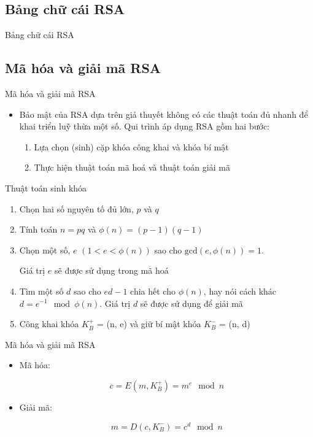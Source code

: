 \documentclass{beamer}
\begin{document}
\subsection{Bảng chữ cái RSA}
\begin{frame}{Bảng chữ cái RSA}

\end{frame}
\subsection{Mã hóa và giải mã RSA}
\begin{frame}{Mã hóa và giải mã RSA}
\begin{itemize}
\item Bảo mật của RSA dựa trên giả thuyết không có các thuật toán đủ nhanh để khai triển luỹ thừa một số. Qui trình áp dụng RSA gồm hai bước:
\begin{enumerate}
\item Lựa chọn (sinh) cặp khóa công khai và khóa bí mật
\item Thực hiện thuật toán mã hoá và thuật toán giải mã
\end{enumerate}
\end{itemize}
\end{frame}
\begin{frame}{Thuật toán sinh khóa}

\begin{enumerate}
\item Chọn hai số nguyên tố đủ lớn, $p$ và $q$
\item Tính toán $n = pq$ và $\phi(n) = (p - 1)(q - 1)$
\item Chọn một số, $e$ $(1 < e < \phi(n))$ sao cho $\text{gcd}(e, \phi(n)) = 1$.

Giá trị $e$ sẽ được sử dụng trong mã hoá
\item Tìm một số $d$ sao cho $ed - 1$ chia hết cho $\phi(n)$, hay nói cách khác $d = e^{-1} \mod \phi(n)$. Giá trị $d$ sẽ được sử dụng để giải mã
\item Công khai khóa $K^+_B$ = (n, e) và giữ bí mật khóa $K^-_B$ = (n, d)
\end{enumerate}
\end{frame}
\begin{frame}{Mã hóa và giải mã RSA}
\begin{itemize}
\item Mã hóa:

\[
c = E (m, K_B^+) = m^e \mod n
\]
\item Giải mã:

\[
m = D (c, K_B^-) = c^d \mod n
\]
\end{itemize}
\end{frame}
\end{document}
